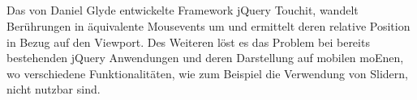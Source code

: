 	\subsection{}
	Das von Daniel Glyde entwickelte \Gls{Framework} jQuery Touchit, wandelt Berührungen in äquivalente Mousevents um und ermittelt deren relative Position in Bezug auf den \Gls{Viewport}. Des Weiteren löst es das Problem bei bereits bestehenden jQuery Anwendungen und deren Darstellung auf mobilen \Gls{moEn}en, wo verschiedene Funktionalitäten, wie zum Beispiel die Verwendung von Slidern, nicht nutzbar sind.
	
	
	
	